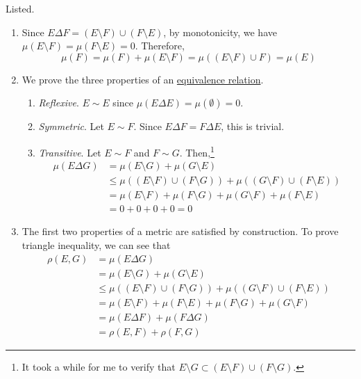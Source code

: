 	\begin{solution}
		Listed. 
		\begin{enumerate}
		  \item Since $E \Delta F = (E \setminus F) \cup (F \setminus E)$, by monotonicity, we have $\mu(E \setminus F) = \mu(F \setminus E) = 0$. Therefore, 
				\begin{equation}
				  \mu(F) = \mu(F) + \mu(E \setminus F) = \mu((E \setminus F) \cup F) = \mu(E)
				\end{equation}

			\item We prove the three properties of an \hyperref[st-def:equivalence_relation]{equivalence relation}. 
				\begin{enumerate}
				  \item \textit{Reflexive}. $E \sim E$ since $\mu(E \Delta E) = \mu(\emptyset) = 0$. 
					\item \textit{Symmetric}. Let $E \sim F$. Since $E \Delta F = F \Delta E$, this is trivial. 
					\item \textit{Transitive}. Let $E \sim F$ and $F \sim G$. Then,\footnote{It took a while for me to verify that $E \setminus G \subset (E \setminus F) \cup (F \setminus G)$.} 
						\begin{align}
							\mu(E \Delta G) & = \mu(E \setminus G) + \mu(G \setminus E) \\ 
															& \leq \mu((E \setminus F) \cup (F \setminus G)) + \mu((G \setminus F) \cup (F \setminus E)) \\ 
															& = \mu(E \setminus F) + \mu(F \setminus G) + \mu(G \setminus F) + \mu(F \setminus E) \\ 
															& = 0 + 0 + 0 + 0 = 0
						\end{align}
				\end{enumerate}

			\item The first two properties of a metric are satisfied by construction. To prove triangle inequality, we can see that 
				\begin{align}
					\rho(E, G) & = \mu(E \Delta G) \\ 
										 & = \mu(E \setminus G) + \mu(G \setminus E) \\ 
										 & \leq \mu((E \setminus F) \cup (F \setminus G)) + \mu((G \setminus F) \cup (F \setminus E)) \\ 
										 & = \mu(E \setminus F) + \mu(F \setminus E) + \mu(F \setminus G) + \mu(G \setminus F) \\ 
										 & = \mu(E \Delta F) + \mu(F \Delta G) \\ 
										 & = \rho(E, F) + \rho(F, G) 
				\end{align}
		\end{enumerate}
	\end{solution}

